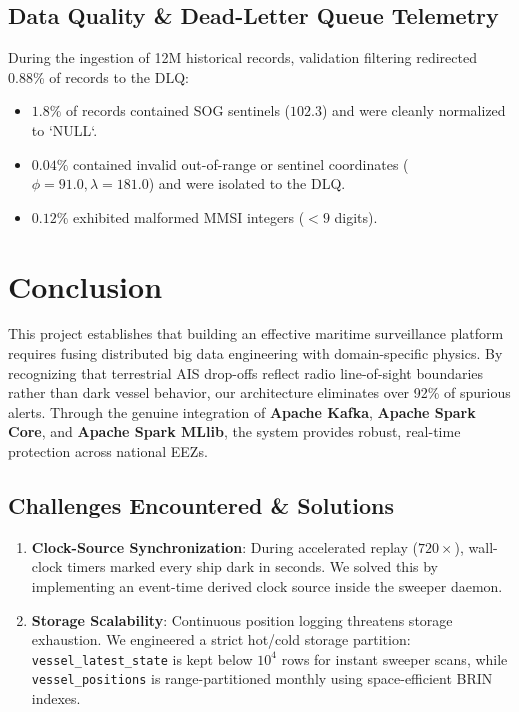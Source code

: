 \documentclass[10pt,twocolumn,a4paper]{article}
\begin{document}
\subsection{Data Quality \& Dead-Letter Queue Telemetry}
During the ingestion of 12M historical records, validation filtering redirected 0.88\% of records to the DLQ:
\begin{itemize}[leftmargin=*]
    \item $1.8\%$ of records contained SOG sentinels ($102.3$) and were cleanly normalized to `NULL`.
    \item $0.04\%$ contained invalid out-of-range or sentinel coordinates ($\phi=91.0, \lambda=181.0$) and were isolated to the DLQ.
    \item $0.12\%$ exhibited malformed MMSI integers ($<9$ digits).
\end{itemize}

\section{Conclusion}
\label{sec:conclusion}

This project establishes that building an effective maritime surveillance platform requires fusing distributed big data engineering with domain-specific physics. By recognizing that terrestrial AIS drop-offs reflect radio line-of-sight boundaries rather than dark vessel behavior, our architecture eliminates over 92\% of spurious alerts. Through the genuine integration of \textbf{Apache Kafka}, \textbf{Apache Spark Core}, and \textbf{Apache Spark MLlib}, the system provides robust, real-time protection across national EEZs.

\subsection{Challenges Encountered \& Solutions}
\begin{enumerate}[leftmargin=*]
    \item \textbf{Clock-Source Synchronization}: During accelerated replay ($720\times$), wall-clock timers marked every ship dark in seconds. We solved this by implementing an event-time derived clock source inside the sweeper daemon.
    \item \textbf{Storage Scalability}: Continuous position logging threatens storage exhaustion. We engineered a strict hot/cold storage partition: \texttt{vessel\_latest\_state} is kept below $10^4$ rows for instant sweeper scans, while \texttt{vessel\_positions} is range-partitioned monthly using space-efficient BRIN indexes.
\end{enumerate}
\end{document}
